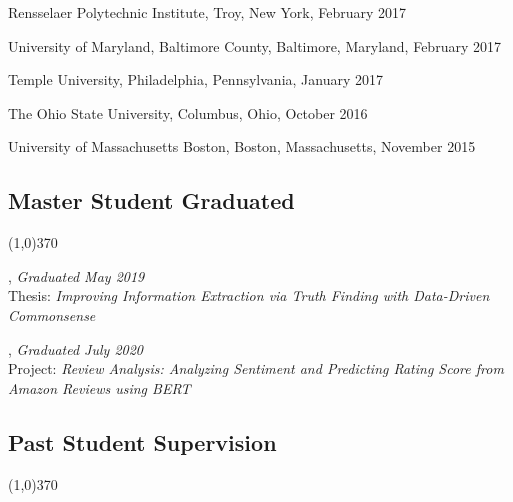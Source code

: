 \documentclass[10pt]{article}
\newenvironment{myindentpar}[1]%
{\begin{list}{}%
         {\setlength{\leftmargin}{#1}}%
         \item[]%
}
{\end{list}}
\newcounter{list}
\begin{document}
\begin{myindentpar}{0.75cm}
\hspace{-0.75cm} Rensselaer Polytechnic Institute, Troy, New York, February 2017

\hspace{-0.75cm} University of Maryland, Baltimore County, Baltimore, Maryland, February 2017

\hspace{-0.75cm} Temple University, Philadelphia, Pennsylvania, January 2017

\hspace{-0.75cm} The Ohio State University, Columbus, Ohio, October 2016

\hspace{-0.75cm} University of Massachusetts Boston, Boston, Massachusetts, November 2015

\end{myindentpar}

\subsection{\sc Master Student Graduated}
\vspace{-0.4cm} \line(1,0){370} \vspace{-0.1cm}

\begin{myindentpar}{0.75cm}

\hspace{-0.75cm}{\bf Xueying Wang}, \textit{Graduated May 2019} \\
	{Thesis: \textit{Improving Information Extraction via Truth Finding with Data-Driven Commonsense}}

\hspace{-0.75cm}{\bf Bhakti Sharma}, \textit{Graduated July 2020} \\
	{Project: \textit{Review Analysis: Analyzing Sentiment and Predicting Rating Score from Amazon Reviews using BERT}}
	

\end{myindentpar}

\subsection{\sc Past Student Supervision}
\vspace{-0.4cm} \line(1,0){370} \vspace{-0.1cm}
\end{document}
